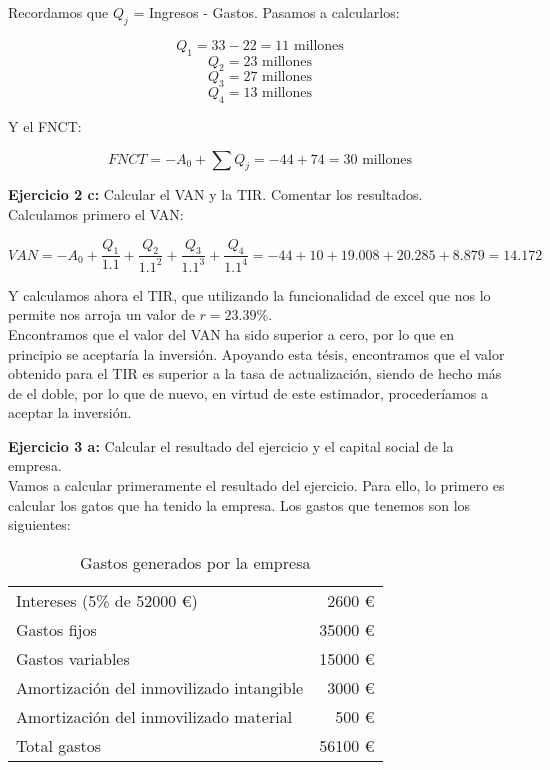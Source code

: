 \documentclass[11pt]{article}
\theoremstyle{plain}
\theoremstyle{definition}
\begin{document}
Recordamos que $Q_j$ = Ingresos - Gastos.  Pasamos a calcularlos:

\[
  Q_1 = 33 - 22 = 11 \text{ millones}
\]
\[
  Q_2 = 23 \text{ millones}
\]
\[
  Q_3 = 27 \text{ millones}
\]
\[
  Q_4 = 13 \text{ millones}
\]

Y el FNCT:

\[
  FNCT = -A_0 + \sum Q_j = -44 + 74 = 30\text{ millones}
\]

\textbf{Ejercicio 2 c:} Calcular el VAN y la TIR. Comentar los
resultados.\\

Calculamos primero el VAN:

\[
  VAN = -A_0 + \frac{Q_1}{1.1} + \frac{Q_2}{1.1^2} + \frac{Q_3}{1.1^3}
  + \frac{Q_4}{1.1^4} = -44 + 10 + 19.008 + 20.285 + 8.879 = 14.172
\]

Y calculamos ahora el TIR, que utilizando la funcionalidad de excel
que nos lo permite nos arroja un valor de $r = 23.39 \%$.\\

Encontramos que el valor del VAN ha sido superior a cero, por lo que en 
principio se aceptaría la inversión. Apoyando esta tésis, encontramos que 
el valor obtenido para el TIR es superior a la tasa de actualización, siendo
de hecho más de el doble, por lo que de nuevo, en virtud de este estimador,
procederíamos a aceptar la inversión.

\textbf{Ejercicio 3 a:} Calcular el resultado del ejercicio y el
capital social de la empresa.\\

Vamos a calcular primeramente el resultado del ejercicio. Para ello,
lo primero es calcular los gatos que ha tenido la empresa. Los gastos
que tenemos son los siguientes:

\begin{table}[H]
  \centering
  \begin{tabular}{lr}
    Intereses (5\% de 52000 €) & 2600 €\\
    Gastos fijos & 35000 €\\
    Gastos variables & 15000 €\\
    Amortización del inmovilizado intangible & 3000 €\\
    Amortización del inmovilizado material & 500 €\\
    \midrule
    Total gastos & 56100 €
  \end{tabular}
  \caption{Gastos generados por la empresa}
\end{table}
\end{document}
